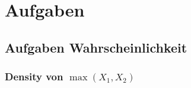 \section{Aufgaben}
%
%
%




\subsection{Aufgaben Wahrscheinlichkeit}
\subsubsection*{\texorpdfstring{Density von \(\max(X_1,X_2)\)}{Density von max()}}

